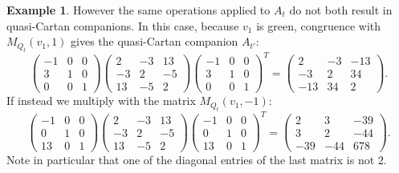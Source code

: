 \documentclass[11pt, letterpaper]{amsart}
\theoremstyle{definition}
\newtheorem{example}[theorem]{Example}
\numberwithin{equation}{section}
\begin{document}
\begin{example}
However the same operations applied to $A_t$ do not both result in quasi-Cartan companions. 
In this case, because $v_1$ is green, congruence with $M_{Q_t}(v_1, 1)$ gives the quasi-Cartan companion $A_{t'}$:
$$ \begin{pmatrix} 
-1 & 0 & 0 \\
3 & 1 & 0 \\
0 & 0 & 1
 \end{pmatrix} \begin{pmatrix}  2 & -3 & 13 \\ -3 & 2 & -5 \\ 13 & -5 & 2 \end{pmatrix} 
 \begin{pmatrix} 
 -1 & 0 & 0 \\
3 & 1 & 0 \\
0 & 0 & 1 
\end{pmatrix}^T  =  
\begin{pmatrix} 
2 & -3 & -13 \\
-3 & 2 & 34 \\
-13 & 34 & 2 
\end{pmatrix}.$$ %
If instead we multiply with the matrix $M_{Q_t}(v_1, -1)$:
$$ \begin{pmatrix} 
-1 & 0 & 0 \\
0 & 1 & 0 \\
13 & 0 & 1
 \end{pmatrix} 
 \begin{pmatrix} 2 & -3 & 13 \\ -3 & 2 & -5 \\ 13 & -5 & 2
 \end{pmatrix} 
 \begin{pmatrix} 
 -1 & 0 & 0 \\
0 & 1 & 0 \\
13 & 0 & 1
 \end{pmatrix}^T= 
\begin{pmatrix} 
2 & 3 & -39 \\
3 & 2 & -44 \\
-39 & -44 & 678 
\end{pmatrix}.$$ %
Note in particular that one of the diagonal entries of the last matrix is not $2$.
\pagebreak[1]


\end{example}
\end{document}

